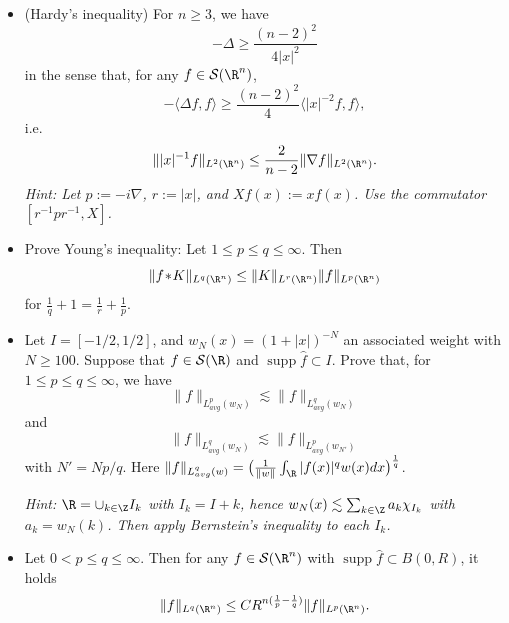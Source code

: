 \begin{itemize}
    \item[1.] (Hardy's inequality) For $n\ge3$, we have
    $$-\Delta\ge\frac{(n-2)^2}{4|x|^2}$$
    in the sense that, for any $f\in\mathcal{S}(\R^n)$,
    $$-\langle\Delta f,f\rangle\ge\frac{(n-2)^2}{4}\langle|x|^{-2}f,f\rangle,$$
    i.e.
    $$\||x|^{-1}f\|_{L^2(\R^n)}\le\frac{2}{n-2}\|\nabla f\|_{L^2(\R^n)}.$$
    \textit{Hint: Let $p:=-i\nabla$, $r:=|x|$, and $Xf(x):=xf(x)$. 
    Use the commutator $[r^{-1}pr^{-1},X]$.}

    \item[2.]Prove Young's inequality: Let $1\le p\le q\le\infty$. Then
    $$\|f\!*\!K\|_{L^q(\R^n)}\le\|K\|_{L^r(\R^n)}\|f\|_{L^p(\R^n)}$$
    for $\frac{1}{q}+1=\frac{1}{r}+\frac{1}{p}$.

    \item[3.]Let $I=[-1/2,1/2]$, and $w_N(x)=(1+|x|)^{-N}$ an associated weight 
    with $N\ge100$. Suppose that $f\in\mathcal{S}(\R)$ 
    and $\operatorname{supp}\hat{f}\subset I$. 
    Prove that, for $1\le p\le q\le\infty$, we have
    $$\|f\|_{L_{avg}^p(w_N)}\lesssim\|f\|_{L_{avg}^q(w_N)}$$
    and
    $$\|f\|_{L_{avg}^q(w_N)}\lesssim\|f\|_{L_{avg}^p(w_{N'})}$$
    with $N'=Np/q$. Here $\|f\|_{L_{avg}^q(w)}
    =\big(\frac{1}{\|w\|}\int_\R|f(x)|^qw(x)dx\big)^\frac{1}{q}$.

    \textit{Hint: $\R=\cup_{k\in\Z}I_k$ with $I_k=I+k$, hence 
    $w_N(x)\lesssim\sum_{k\in\Z}a_k\chi_{I_k}$ with $a_k=w_N(k)$. 
    Then apply Bernstein's inequality to each $I_k$.}
    
    \item[4.]Let $0<p\le q\le\infty$. Then for any $f\in\mathcal{S}(\R^n)$ with 
    $\operatorname{supp}\hat{f}\subset B(0,R)$, it holds
    $$\|f\|_{L^q(\R^n)}\le CR^{n(\frac{1}{p}-\frac{1}{q})}\|f\|_{L^p(\R^n)}.$$
\end{itemize}


